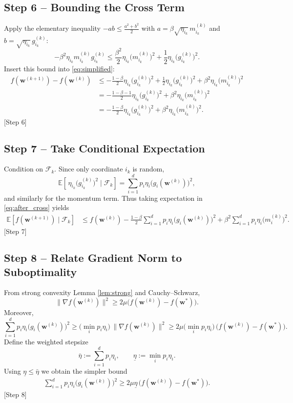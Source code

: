 \documentclass{article}
\newcommand{\E}{\mathbb{E}}
\begin{document}
\subsection*{Step 6 – Bounding the Cross Term}
Apply the elementary inequality $-ab\le\frac{a^{2}+b^{2}}{2}$ with
$a=\beta\sqrt{\eta_{i_k}}\,m_{i_k}^{(k)}$ and $b=\sqrt{\eta_{i_k}}\,g_{i_k}^{(k)}$:
\[
-\beta^{2}\eta_{i_k} m_{i_k}^{(k)} g_{i_k}^{(k)}
\le \frac{\beta^{2}}{2}\eta_{i_k}\bigl(m_{i_k}^{(k)}\bigr)^{2}
   +\frac{1}{2}\eta_{i_k}\bigl(g_{i_k}^{(k)}\bigr)^{2}.
\]
Insert this bound into \eqref{eq:simplified}:
\begin{align}
f(\mathbf w^{(k+1)})-f(\mathbf w^{(k)})
&\le -\frac{1-\beta}{2}\eta_{i_k}\bigl(g_{i_k}^{(k)}\bigr)^{2}
    +\frac{1}{2}\eta_{i_k}\bigl(g_{i_k}^{(k)}\bigr)^{2}
    +\beta^{2}\eta_{i_k}\bigl(m_{i_k}^{(k)}\bigr)^{2} \nonumber\\
&= -\frac{1-\beta-1}{2}\eta_{i_k}\bigl(g_{i_k}^{(k)}\bigr)^{2}
    +\beta^{2}\eta_{i_k}\bigl(m_{i_k}^{(k)}\bigr)^{2} \nonumber\\
&= -\frac{1-\beta}{2}\eta_{i_k}\bigl(g_{i_k}^{(k)}\bigr)^{2}
    +\beta^{2}\eta_{i_k}\bigl(m_{i_k}^{(k)}\bigr)^{2}. \label{eq:after_cross}
\end{align}
[Step 6]

\subsection*{Step 7 – Take Conditional Expectation}
Condition on $\mathcal F_k$. Since only coordinate $i_k$ is random,
\[
\E\!\left[\,\eta_{i_k}\bigl(g_{i_k}^{(k)}\bigr)^{2}\mid\mathcal F_k\right]
= \sum_{i=1}^{d}p_i\eta_i\bigl(g_i(\mathbf w^{(k)})\bigr)^{2},
\]
and similarly for the momentum term.
Thus taking expectation in \eqref{eq:after_cross} yields
\begin{align}
\E\!\left[f(\mathbf w^{(k+1)})\mid\mathcal F_k\right]
&\le f(\mathbf w^{(k)})
   -\frac{1-\beta}{2}\sum_{i=1}^{d}p_i\eta_i\bigl(g_i(\mathbf w^{(k)})\bigr)^{2}
   +\beta^{2}\sum_{i=1}^{d}p_i\eta_i\bigl(m_i^{(k)}\bigr)^{2}. \label{eq:exp_step}
\end{align}
[Step 7]

\subsection*{Step 8 – Relate Gradient Norm to Suboptimality}
From strong convexity Lemma \ref{lem:strong} and Cauchy–Schwarz,
\[
\|\nabla f(\mathbf w^{(k)})\|^{2}
\ge 2\mu\bigl(f(\mathbf w^{(k)})-f(\mathbf w^{*})\bigr).
\]
Moreover,
\[
\sum_{i=1}^{d}p_i\eta_i\bigl(g_i(\mathbf w^{(k)})\bigr)^{2}
\ge \bigl(\min_i p_i\eta_i\bigr)\,\|\nabla f(\mathbf w^{(k)})\|^{2}
\ge 2\mu\bigl(\min_i p_i\eta_i\bigr)\,
      \bigl(f(\mathbf w^{(k)})-f(\mathbf w^{*})\bigr).
\]
Define the weighted stepsize
\[
\bar\eta:=\sum_{i=1}^{d}p_i\eta_i,
\qquad
\underline\eta:=\min_{i}p_i\eta_i.
\]
Using $\underline\eta\le\bar\eta$ we obtain the simpler bound
\begin{align}
\sum_{i=1}^{d}p_i\eta_i\bigl(g_i(\mathbf w^{(k)})\bigr)^{2}
\ge 2\mu\underline\eta\,
      \bigl(f(\mathbf w^{(k)})-f(\mathbf w^{*})\bigr). \label{eq:grad_bound}
\end{align}
[Step 8]
\end{document}
